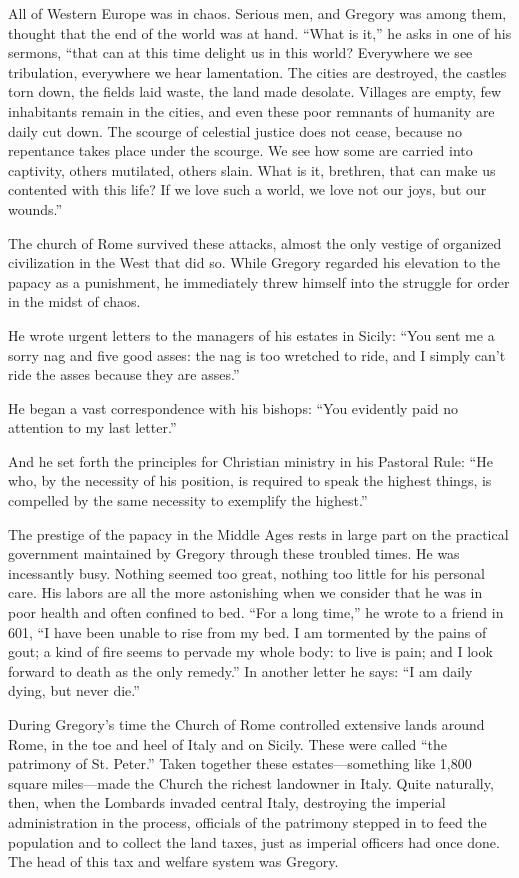 All of Western Europe was in chaos. Serious men, and Gregory was among them, thought that the end of
the world was at hand. “What is it,” he asks in one of his sermons, “that can at this time delight
us in this world? Everywhere we see tribulation, everywhere we hear lamentation. The cities are
destroyed, the castles torn down, the fields laid waste, the land made desolate. Villages are empty,
few inhabitants remain in the cities, and even these poor remnants of humanity are daily cut down.
The scourge of celestial justice does not cease, because no repentance takes place under the
scourge. We see how some are carried into captivity, others mutilated, others slain. What is it,
brethren, that can make us contented with this life? If we love such a world, we love not our joys,
but our wounds.”

The church of Rome survived these attacks, almost the only vestige of organized civilization in the
West that did so. While Gregory regarded his elevation to the papacy as a punishment, he immediately
threw himself into the struggle for order in the midst of chaos.

He wrote urgent letters to the managers of his estates in Sicily: “You sent me a sorry nag and five
good asses: the nag is too wretched to ride, and I simply can’t ride the asses because they are
asses.”

He began a vast correspondence with his bishops: “You evidently paid no attention to my last
letter.”

And he set forth the principles for Christian ministry in his Pastoral Rule: “He who, by the
necessity of his position, is required to speak the highest things, is compelled by the same
necessity to exemplify the highest.”

The prestige of the papacy in the Middle Ages rests in large part on the practical government
maintained by Gregory through these troubled times. He was incessantly busy. Nothing seemed too
great, nothing too little for his personal care. His labors are all the more astonishing when we
consider that he was in poor health and often confined to bed. “For a long time,” he wrote to a
friend in 601, “I have been unable to rise from my bed. I am tormented by the pains of gout; a kind
of fire seems to pervade my whole body: to live is pain; and I look forward to death as the only
remedy.” In another letter he says: “I am daily dying, but never die.”

During Gregory’s time the Church of Rome controlled extensive lands around Rome, in the toe and heel
of Italy and on Sicily. These were called “the patrimony of St. Peter.” Taken together these
estates—something like 1,800 square miles—made the Church the richest landowner in Italy. Quite
naturally, then, when the Lombards invaded central Italy, destroying the imperial administration in
the process, officials of the patrimony stepped in to feed the population and to collect the land
taxes, just as imperial officers had once done. The head of this tax and welfare system was Gregory.


